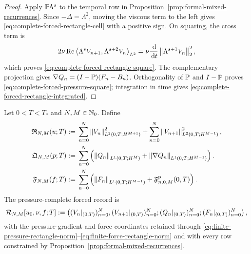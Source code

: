 \begin{proof}
Apply \(\mathbb P\Lambda^s\) to the temporal row in
Proposition~\ref{prop:formal-mixed-recurrences}. Since
\(-\Delta=\Lambda^2\), moving the viscous term to the left gives
\eqref{eq:complete-forced-rectangle-cell} with a positive sign.
On squaring, the cross term is
\[
 2\nu\operatorname{Re}
 \left\langle \Lambda^sV_{n+1},\Lambda^{s+2}V_n\right\rangle_{L^2}
 =\nu\frac{\,\mathrm d}{\,\mathrm d t}\left\lVert \Lambda^{s+1}V_n\right\rVert_2^2,
\]
which proves \eqref{eq:complete-forced-rectangle-square}.  The complementary
projection gives
\(\nabla Q_n=(I-\mathbb P)(F_n-B_n)\).  Orthogonality of \(\mathbb P\) and
\(I-\mathbb P\) proves \eqref{eq:complete-forced-pressure-square}; integration in
time gives \eqref{eq:complete-forced-rectangle-integrated}.
\end{proof}

\begin{definition}
\label{def:finite-rectangle}
Let \(0<T<T_*\) and \(N,M\in\mathbb N_0\).  Define
\begin{align}
 \mathfrak R_{N,M}(u;T)
 :={}&\sum_{n=0}^{N}
 \left\lVert V_n\right\rVert_{L^2(0,T;H^{M+1})}^2
 +\sum_{n=0}^{N}
 \left\lVert V_{n+1}\right\rVert_{L^2(0,T;H^{M-1})}^2,
 \label{eq:finite-rectangle-norm}\\
 \mathfrak Q_{N,M}(p;T)
 :={}&\sum_{n=0}^{N}
 \left(
 \left\lVert Q_n\right\rVert_{L^1(0,T;H^M)}
 +\left\lVert \nabla Q_n\right\rVert_{L^1(0,T;H^{M-1})}
 \right).
 \label{eq:finite-pressure-rectangle-norm}
 \\
 \mathfrak F_{N,M}(f;T)
 :={}&\sum_{n=0}^{N}\left(
 \left\lVert F_n\right\rVert_{L^1(0,T;H^{M-1})}
 +\mathfrak F^{\rm p}_{n,0,M}(0,T)
 \right).
 \label{eq:finite-force-rectangle-norm}
\end{align}
The pressure-complete forced record is
\[
 \mathcal R_{N,M}[u_0,\nu,f;T]
 :=\left(
 (V_n|_{(0,T)})_{n=0}^{N},
 (V_{n+1}|_{(0,T)})_{n=0}^{N};
 (Q_n|_{(0,T)})_{n=0}^{N};
 (F_n|_{(0,T)})_{n=0}^{N}
 \right),
\]
with the pressure-gradient and force coordinates retained through
\eqref{eq:finite-pressure-rectangle-norm}--\eqref{eq:finite-force-rectangle-norm}
and with every row constrained by
Proposition~\ref{prop:formal-mixed-recurrences}.
\end{definition}

